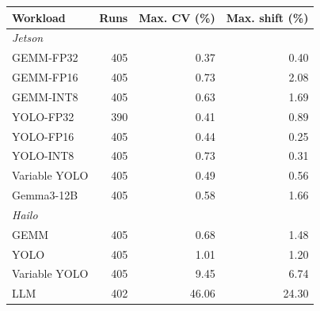 \begin{tabular}{@{}lrrr@{}}
\toprule
Workload & Runs & Max. CV (\%) & Max. shift (\%) \\
\midrule
\multicolumn{4}{l}{\textit{Jetson}} \\
GEMM-FP32 & 405 & 0.37 & 0.40 \\
GEMM-FP16 & 405 & 0.73 & 2.08 \\
GEMM-INT8 & 405 & 0.63 & 1.69 \\
YOLO-FP32 & 390 & 0.41 & 0.89 \\
YOLO-FP16 & 405 & 0.44 & 0.25 \\
YOLO-INT8 & 405 & 0.73 & 0.31 \\
Variable YOLO & 405 & 0.49 & 0.56 \\
Gemma3-12B & 405 & 0.58 & 1.66 \\
\midrule
\multicolumn{4}{l}{\textit{Hailo}} \\
GEMM & 405 & 0.68 & 1.48 \\
YOLO & 405 & 1.01 & 1.20 \\
Variable YOLO & 405 & 9.45 & 6.74 \\
LLM & 402 & 46.06 & 24.30 \\
\bottomrule
\end{tabular}
